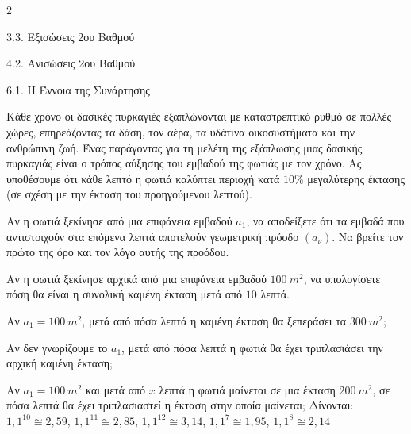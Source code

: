 \begin{ylh}{2}
    \item 3.3. Εξισώσεις 2ου Βαθμού
    \item 4.2. Ανισώσεις 2ου Βαθμού
    \item 6.1. Η Έννοια της Συνάρτησης
\end{ylh}
Κάθε χρόνο οι δασικές πυρκαγιές εξαπλώνονται με καταστρεπτικό ρυθμό σε πολλές χώρες, επηρεάζοντας τα δάση, τον αέρα, τα υδάτινα οικοσυστήματα και την ανθρώπινη ζωή. Ένας παράγοντας για τη μελέτη της εξάπλωσης μιας δασικής πυρκαγιάς είναι ο τρόπος αύξησης του εμβαδού της φωτιάς με τον χρόνο. Ας υποθέσουμε ότι κάθε λεπτό η φωτιά καλύπτει περιοχή κατά $10\%$ μεγαλύτερης έκτασης (σε σχέση με την έκταση του προηγούμενου λεπτού).

\begin{alist}
\item Αν η φωτιά ξεκίνησε από μια επιφάνεια εμβαδού $a_1$, να αποδείξετε ότι τα εμβαδά που αντιστοιχούν στα επόμενα λεπτά αποτελούν γεωμετρική πρόοδο $(a_\nu)$. Να βρείτε τον πρώτο της όρο και τον λόγο αυτής της προόδου.
\item Αν η φωτιά ξεκίνησε αρχικά από μια επιφάνεια εμβαδού $100\ m^2$, να υπολογίσετε πόση θα είναι η συνολική καμένη έκταση μετά από $10$ λεπτά.
\item Αν $a_1 = 100\ m^2$, μετά από πόσα λεπτά η καμένη έκταση θα ξεπεράσει τα $300\ m^2$;
\item
\begin{rlist}
\item Αν δεν γνωρίζουμε το $a_1$, μετά από πόσα λεπτά η φωτιά θα έχει τριπλασιάσει την αρχική καμένη έκταση;
\item Αν $a_1 = 100\ m^2$ και μετά από $x$ λεπτά η φωτιά μαίνεται σε μια έκταση $200\ m^2$, σε πόσα λεπτά θα έχει τριπλασιαστεί η έκταση στην οποία μαίνεται;
Δίνονται: $1{,}1^{10} \cong 2{,}59$, $1{,}1^{11} \cong 2{,}85$, $1{,}1^{12} \cong 3{,}14$, $1{,}1^{7} \cong 1{,}95$, $1{,}1^{8} \cong 2{,}14$
\end{rlist}
\end{alist}

